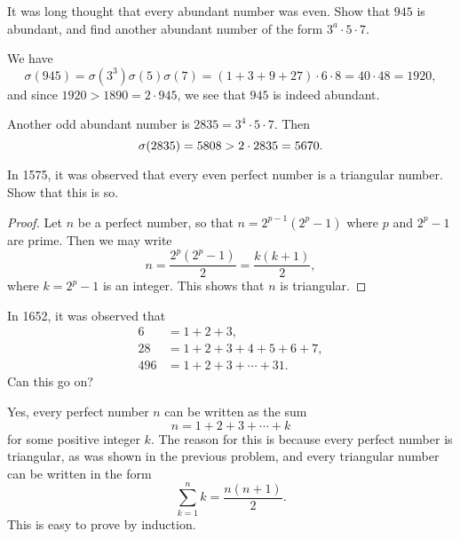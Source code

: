  It was long thought that every abundant number was
even. Show that $945$ is abundant, and find another abundant number of
the form $3^a\cdot5\cdot7$.
\begin{solution}
  We have
  \begin{equation*}
    \sigma(945)
    = \sigma(3^3)\sigma(5)\sigma(7)
    = (1 + 3 + 9 + 27)\cdot6\cdot8
    = 40\cdot48
    = 1920,
  \end{equation*}
  and since $1920 > 1890 = 2\cdot945$, we see that $945$ is indeed
  abundant.

  Another odd abundant number is $2835 = 3^4\cdot5\cdot7$. Then
  \begin{equation*}
    \sigma(2835) = 5808 > 2\cdot2835 = 5670. \qedhere
  \end{equation*}
\end{solution}

 In 1575, it was observed that every even perfect number is a
triangular number. Show that this is so.
\begin{proof}
  Let $n$ be a perfect number, so that $n = 2^{p-1}(2^p - 1)$ where
  $p$ and $2^p-1$ are prime. Then we may write
  \begin{equation*}
    n = \frac{2^p(2^p - 1)}2 = \frac{k(k + 1)}2,
  \end{equation*}
  where $k = 2^p - 1$ is an integer. This shows that $n$ is triangular.
\end{proof}

 In 1652, it was observed that
\begin{align*}
  6 &= 1 + 2 + 3, \\
  28 &= 1 + 2 + 3 + 4 + 5 + 6 + 7, \\
  496 &= 1 + 2 + 3 + \cdots + 31.
\end{align*}
Can this go on?
\begin{solution}
  Yes, every perfect number $n$ can be written as the sum
  \begin{equation*}
    n = 1 + 2 + 3 + \cdots + k
  \end{equation*}
  for some positive integer $k$. The reason for this is because every
  perfect number is triangular, as was shown in the previous problem,
  and every triangular number can be written in the form
  \begin{equation*}
    \sum_{k=1}^nk = \frac{n(n+1)}2.
  \end{equation*}
  This is easy to prove by induction.
\end{solution}

